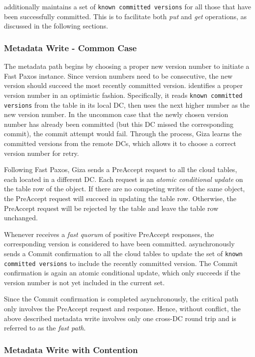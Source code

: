 {\name} additionally maintains a set of {\tt known committed versions} for all
those that have been successfully committed. This is to facilitate both {\em put}
and {\em get} operations, as discussed in the following sections.

\subsubsection{Metadata Write - Common Case}

The metadata path begins by choosing a proper new version number to initiate a 
Fast Paxos instance. Since version numbers need to be consecutive, 
the new version should succeed the most recently committed version.
{\name} identifies a proper version number in an optimistic fashion.
Specifically, it reads {\tt known committed versions} from the table in its local DC,
then uses the next higher number as the new version number.
In the uncommon case that the newly chosen version number has already been committed
(but this DC missed the corresponding commit), the commit attempt would fail.
Through the process, Giza learns the committed versions from the remote DCs,
which allows it to choose a correct version number for retry.

Following Fast Paxos, Giza sends a PreAccept request to all the cloud tables,
each located in a different DC. 
Each request is an {\em atomic conditional update} on the table row of the object.
If there are no competing writes of the same object, the PreAccept request
will succeed in updating the table row. Otherwise, the PreAccept request will be
rejected by the table and leave the table row unchanged. 

Whenever {\name} receives a {\em fast quorum} of positive PreAccept
responses, the corresponding version is considered to have been committed.
{\name} asynchronously sends a Commit confirmation to all the cloud tables
to update the set of {\tt known committed versions} to include the recently
committed version. The Commit confirmation is again an atomic conditional
update, which only succeeds if the version number is not yet included in the
current set.

Since the Commit confirmation is completed asynchronously, the critical path
only involves the PreAccept request and response. Hence, without conflict, the
above described metadata write involves only one cross-DC round trip and is
referred to as the {\em fast path}.

\subsubsection{Metadata Write with Contention}

